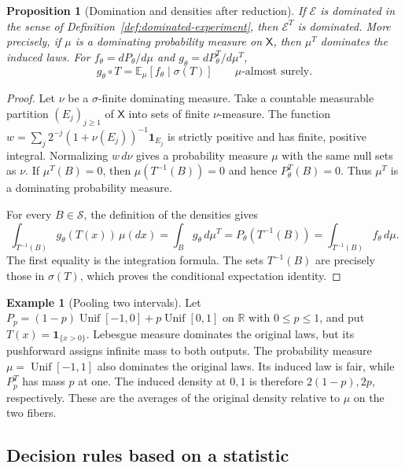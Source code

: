 \documentclass[11pt,oneside]{book}
\newtheorem{proposition}[theorem]{Proposition}
\theoremstyle{definition}
\newtheorem{example}[theorem]{Example}
\theoremstyle{remark}
\newcommand{\R}{\mathbb R}
\begin{document}
\begin{proposition}[Domination and densities after reduction]
\label{prop:statistic-induced-density}
If $\mathcal E$ is dominated in the sense of
Definition~\ref{def:dominated-experiment}, then $\mathcal E^T$
is dominated. More precisely, if $\mu$ is a dominating
probability measure on $\mathsf X$, then $\mu^T$ dominates the
induced laws. For $f_\theta=dP_\theta/d\mu$ and
$g_\theta=dP_\theta^T/d\mu^T$,
\[
g_\theta\circ T=\mathbb E_\mu[f_\theta\mid\sigma(T)]
\qquad \mu\text{-almost surely}.
\]
\end{proposition}
\begin{proof}
Let $\nu$ be a $\sigma$-finite dominating measure. Take a countable
measurable partition $(E_j)_{j\geq1}$ of $\mathsf X$ into sets of
finite $\nu$-measure. The function
$w=\sum_j 2^{-j}(1+\nu(E_j))^{-1}\mathbf 1_{E_j}$ is strictly
positive and has finite, positive integral. Normalizing $w\,d\nu$
gives a probability measure $\mu$ with the same null sets as $\nu$.
If $\mu^T(B)=0$, then $\mu(T^{-1}(B))=0$ and hence
$P_\theta^T(B)=0$. Thus $\mu^T$ is a dominating probability measure.

For every $B\in\mathcal S$, the definition of the densities gives
\[
\int_{T^{-1}(B)}g_\theta(T(x))\,\mu(dx)
=\int_B g_\theta\,d\mu^T
=P_\theta(T^{-1}(B))
=\int_{T^{-1}(B)}f_\theta\,d\mu.
\]
The first equality is the integration formula. The sets $T^{-1}(B)$
are precisely those in $\sigma(T)$, which proves the conditional
expectation identity.
\end{proof}

\begin{example}[Pooling two intervals]
\label{ex:statistic-domination-pooling}
Let $P_p=(1-p)\operatorname{Unif}[-1,0]+p\operatorname{Unif}[0,1]$
on $\R$ with $0\leq p\leq1$, and put $T(x)=\mathbf 1_{\{x>0\}}$.
Lebesgue measure dominates the original laws, but its pushforward
assigns infinite mass to both outputs. The probability measure
$\mu=\operatorname{Unif}[-1,1]$ also dominates the original laws.
Its induced law is fair, while $P_p^T$ has mass $p$ at one.
The induced density at $0,1$ is therefore $2(1-p),2p$,
respectively. These are the averages of the original density
relative to $\mu$ on the two fibers.
\end{example}

\subsection{Decision rules based on a statistic}
\label{subsec:statistic-decision-rules}
\end{document}

